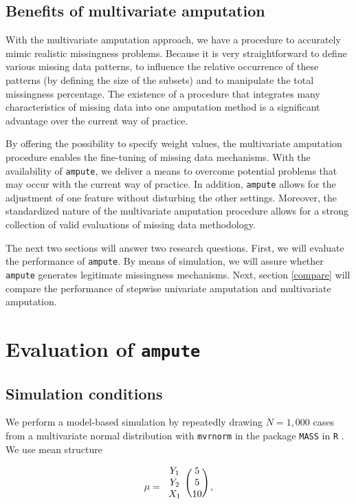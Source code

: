 \documentclass[11pt,a4paper]{article}
\newcommand{\code}[1]{\texttt{#1}}
\begin{document}
\subsection{\normalsize Benefits of multivariate amputation}\label{solution}

With the multivariate amputation approach, we have a procedure to accurately mimic realistic missingness problems. Because it is very straightforward to define various missing data patterns, to influence the relative occurrence of these patterns (by defining the size of the subsets) and to manipulate the total missingness percentage. The existence of a procedure that integrates many characteristics of missing data into one amputation method is a significant advantage over the current way of practice.

By offering the possibility to specify weight values, the multivariate amputation procedure enables the fine-tuning of missing data mechanisms. With the availability of \code{ampute}, we deliver a means to overcome potential problems that may occur with the current way of practice. In addition, \code{ampute} allows for the adjustment of one feature without disturbing the other settings. Moreover, the standardized nature of the multivariate amputation procedure allows for a strong collection of valid evaluations of missing data methodology.

The next two sections will answer two research questions. First, we will evaluate the performance of \code{ampute}. By means of simulation, we will assure whether \code{ampute} generates legitimate missingness mechanisms. Next, section \ref{compare} will compare the performance of stepwise univariate amputation and multivariate amputation. 

\section{Evaluation of \code{ampute}}\label{evaluation}

\subsection{Simulation conditions}

We perform a model-based simulation by repeatedly drawing $N = 1,000$ cases from a multivariate normal distribution with \code{mvrnorm} in the package \code{MASS} \citep{MASS} in \code{R} \citep{R}. We use mean structure

\begin{equation*}
\mu = 
\begin{blockarray}{cc}
\begin{block}{c(c)}
Y_1&5\\
Y_2&5\\
X_1&10\\
\end{block}
\end{blockarray}\hspace{1mm},
\end{equation*} 
\end{document}
